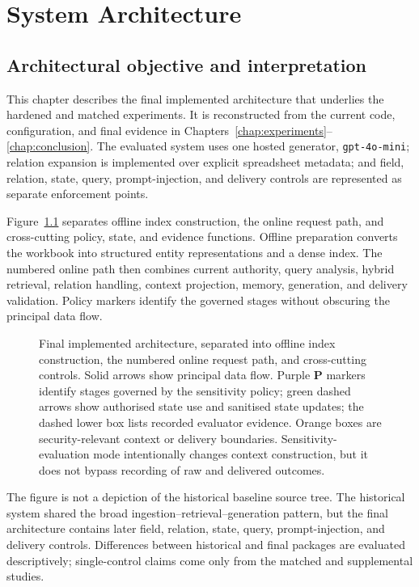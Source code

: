 \chapter{System Architecture}
\label{chap:architecture}

\section{Architectural objective and interpretation}

This chapter describes the final implemented architecture that underlies the hardened and matched experiments. It is reconstructed from the current code, configuration, and final evidence in Chapters~\ref{chap:experiments}--\ref{chap:conclusion}. The evaluated system uses one hosted generator, \texttt{gpt-4o-mini}; relation expansion is implemented over explicit spreadsheet metadata; and field, relation, state, query, prompt-injection, and delivery controls are represented as separate enforcement points.

Figure~\ref{fig:system-architecture} separates offline index construction, the online request path, and cross-cutting policy, state, and evidence functions. Offline preparation converts the workbook into structured entity representations and a dense index. The numbered online path then combines current authority, query analysis, hybrid retrieval, relation handling, context projection, memory, generation, and delivery validation. Policy markers identify the governed stages without obscuring the principal data flow.

\begin{figure}[htbp]
  \centering
  \resizebox{0.98\textwidth}{!}{}
  \caption[Final sensitivity-aware RAG architecture]{Final implemented architecture, separated into offline index construction, the numbered online request path, and cross-cutting controls. Solid arrows show principal data flow. Purple \textbf{P} markers identify stages governed by the sensitivity policy; green dashed arrows show authorised state use and sanitised state updates; the dashed lower box lists recorded evaluator evidence. Orange boxes are security-relevant context or delivery boundaries. Sensitivity-evaluation mode intentionally changes context construction, but it does not bypass recording of raw and delivered outcomes.}
  \label{fig:system-architecture}
\end{figure}

The figure is not a depiction of the historical baseline source tree. The historical system shared the broad ingestion--retrieval--generation pattern, but the final architecture contains later field, relation, state, query, prompt-injection, and delivery controls. Differences between historical and final packages are evaluated descriptively; single-control claims come only from the matched and supplemental studies.

